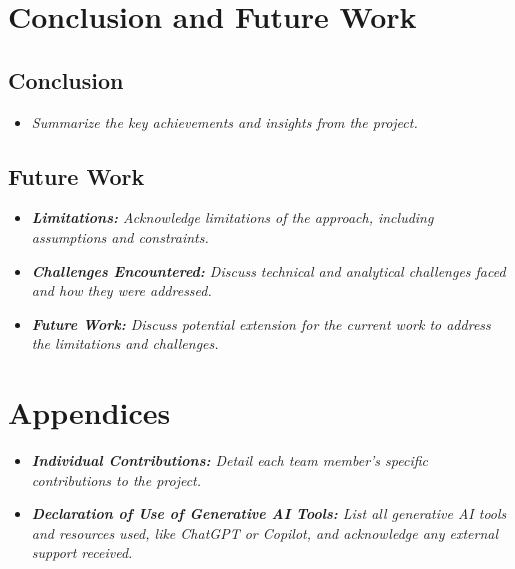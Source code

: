 \documentclass[11pt,twoside,a4paper]{article}
\begin{document}
\section{Conclusion and Future Work}
\subsection{Conclusion}
\begin{itemize}
    \item \emph{Summarize the key achievements and insights from the project.}
\end{itemize}

\subsection{Future Work}
\begin{itemize}
    \item \emph{\textbf{Limitations:} Acknowledge limitations of the approach, including assumptions and constraints.}
    \item \emph{\textbf{Challenges Encountered:} Discuss technical and analytical challenges faced and how they were addressed.}
    \item \emph{\textbf{Future Work:} Discuss potential extension for the current work to address the limitations and challenges.}
\end{itemize}

\vfill
\newpage

\vfill
\newpage
\section*{Appendices}
\begin{itemize}
    \item \emph{\textbf{Individual Contributions:} Detail each team member's specific contributions to the project.}
    \item \emph{\textbf{Declaration of Use of Generative AI Tools:} List all generative AI tools and resources used, like ChatGPT or Copilot, and acknowledge any external support received.}
\end{itemize}
\end{document}
